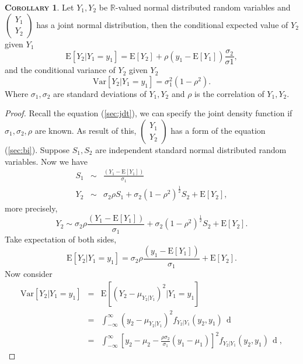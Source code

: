 \documentclass[a4paper, twoside, 11pt]{article}
\theoremstyle{definition}
\newtheorem{corollary}[definition]{\scshape Corollary}
\newcommand{\sqbr}[1]{\left[ {#1} \right]}
\begin{document}
\begin{corollary}
  Let $Y_1, Y_2$ be $\mathbb{R}$-valued normal distributed random variables and $\left(
    \begin{array}{c}
      Y_1 \\
      Y_2
    \end{array}
	\right)$  has a joint normal distribution, then the conditional expected value of $Y_2$ given $Y_1$
    $$
	\mathrm{E}[Y_2| Y_1=y_1] = \mathrm{E}[Y_2] + \rho (y_1 - \mathrm{E}[Y_1])\frac{\sigma_2}{\sigma1},
	$$
	and the conditional variance of $Y_2$ given $Y_2$
	$$
		\mathrm{Var}[Y_2| Y_1 = y_1] = \sigma_1^2 (1 - \rho^2).
	$$
	Where $\sigma_1, \sigma_2$ are standard deviations of $Y_1, Y_2$ and $\rho$ is the correlation of $Y_1, Y_2$.
\end{corollary}

\begin{proof}
  Recall the equation (\ref{sec:jdt}), we can specify the joint density function if $\sigma_1, \sigma_2, \rho$ are known. As result of this,
  $\left(
    \begin{array}{c}
      Y_1 \\
      Y_2
    \end{array}
	\right)$ has a form of the equation (\ref{sec:bi}).
  Suppose $S_1, S_2$ are independent standard normal distributed random variables. Now we have
  \begin{eqnarray*}
	S_1 &\sim& \frac{(Y_1 - \mathrm{E}[Y_1])}{\sigma_1} \\
	Y_2 &\sim& \sigma_2\rho S_1 + \sigma_2(1-\rho^2)^{\frac{1}{2}} S_2 + \mathrm{E}[Y_2],
  \end{eqnarray*}
  more precisely,
  $$
  Y_2 \sim \sigma_2\rho \frac{(Y_1 - \mathrm{E}[Y_1])}{\sigma_1}  + \sigma_2(1-\rho^2)^{\frac{1}{2}} S_2 + \mathrm{E}[Y_2].
  $$
  Take expectation of both sides, 
  \begin{equation*}
	\mathrm{E}[Y_2|Y_1=y_1] = \sigma_2\rho \frac{(y_1 - \mathrm{E}[Y_1])}{\sigma_1} + \mathrm{E}[Y_2].
  \end{equation*}
  Now consider
  \begin{eqnarray*}
	\mathrm{Var}[Y_2|Y_1=y_1] &=&  \mathrm{E}[(Y_2 - \mu_{Y_2|Y_1})^2|Y_1=y_1]\\
							  &=& \int_{-\infty}^{\infty}(y_2 - \mu_{Y_2|Y_1})^2f_{Y_2|Y_1}(y_2, y_1)\,\mathop{dy_2}\\
							  &=& \int_{-\infty}^{\infty}\sqbr{y_2 - \mu_2 - \frac{\rho\sigma_2}{\sigma_1}(y_1-\mu_1)}^2f_{Y_2|Y_1}(y_2, y_1)\,\mathop{dy_2},
  \end{eqnarray*}

\end{proof}
\end{document}
